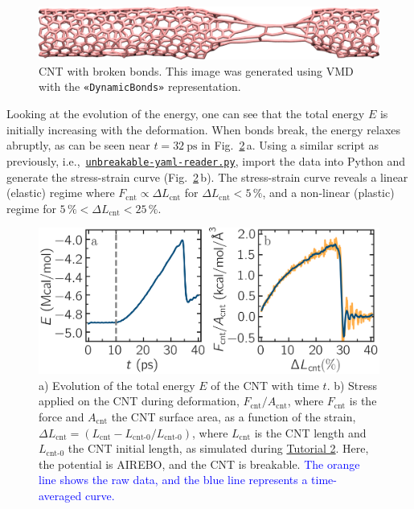 \documentclass[9pt,tutorial]{livecoms}
\newcommand{\guicmd}[1]{\textcolor{command}{\texttt{«#1»}}} %
\newcommand{\dwlcmd}[1]{\textcolor{download}{\texttt{#1}}} %
\newcommand{\filepath}{https://raw.githubusercontent.com/lammpstutorials/lammpstutorials-article/main/files/}
\begin{document}
\begin{figure}
\centering
\includegraphics[width=\linewidth]{CNT-deformed-breakable}
\caption{CNT with broken bonds.  This image was generated using
VMD~\cite{vmd_home,humphrey1996vmd} with the \guicmd{DynamicBonds} representation.}
\label{fig:CNT-deformed-breakable}
\end{figure}

Looking at the evolution of the energy, one can see that the total
energy $E$ is initially increasing with the deformation.  When bonds
break, the energy relaxes abruptly, as can be seen near $t=32~\text{ps}$
in Fig.~\ref{fig:CNT-breakable-energy-stress}\,a.  Using a similar
script as previously,
i.e.,~\href{\filepath tutorial2/unbreakable-yaml-reader.py}{\dwlcmd{unbreakable-yaml-reader.py}},
import the data into Python and generate the stress-strain curve
(Fig.~\ref{fig:CNT-breakable-energy-stress}\,b).  The stress-strain
curve reveals a linear (elastic) regime where
$F_\text{cnt} \propto \Delta L_\text{cnt}$ for
$\Delta L_\text{cnt} < 5\,\%$, and a non-linear (plastic) regime for
$5\,\% < \Delta L_\text{cnt} < 25\,\%$.

\begin{figure}
\centering
\includegraphics[width=\linewidth]{CNT-breakable-stress-energy}
\caption{a) Evolution of the total energy $E$ of the CNT with time $t$.
b) Stress applied on the CNT during deformation, $F_\text{cnt}/A_\text{cnt}$,
where $F_\text{cnt}$ is the force and $A_\text{cnt}$ the CNT surface area,
as a function of the strain, $\Delta L_\text{cnt} = (L_\text{cnt}-L_\text{cnt-0}/L_\text{cnt-0})$, where
$L_\text{cnt}$ is the CNT length and $L_\text{cnt-0}$ the CNT initial length,
as simulated during \hyperref[carbon-nanotube-label]{Tutorial 2}.
Here, the potential is AIREBO, and the CNT is breakable.  \textcolor{blue}{The orange line
shows the raw data, and the blue line represents a time-averaged curve.}}
\label{fig:CNT-breakable-energy-stress}
\end{figure}
\end{document}
